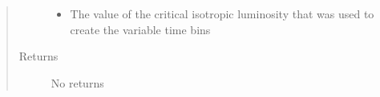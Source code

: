 \documentclass[letterpaper,10pt,english]{sphinxmanual}
\begin{document}
\begin{fulllineitems}
\begin{quote}
\begin{description}
\begin{itemize}
\item {} 
 \textendash{} The value of the critical isotropic luminosity that was used to create the variable time bins

\end{itemize}

\item[{Returns}] \leavevmode
No returns

\end{description}\end{quote}

\end{fulllineitems}

\end{document}
